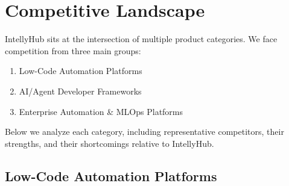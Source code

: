 \documentclass[11pt, a4paper, oneside]{article}
\begin{document}
\section{Competitive Landscape}
IntellyHub sits at the intersection of multiple product categories. We face competition from three main groups: 
\begin{enumerate} 
    \item Low-Code Automation Platforms
    \item AI/Agent Developer Frameworks
    \item Enterprise Automation \& MLOps Platforms
\end{enumerate}

Below we analyze each category, including representative competitors, their strengths, and their shortcomings relative to IntellyHub.

\subsection{Low-Code Automation Platforms}
\end{document}
